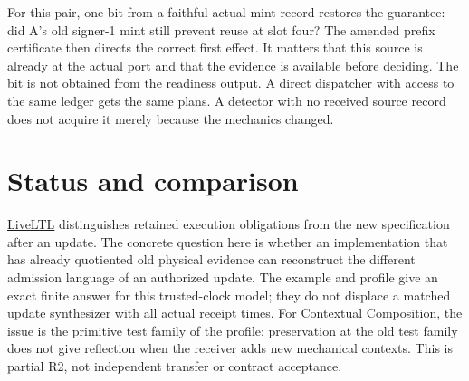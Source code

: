 \documentclass[11pt]{article}
\begin{document}
For this pair, one bit from a faithful actual-mint record restores the
guarantee: did A's old signer-1 mint still prevent reuse at slot four?
The amended prefix certificate then directs the correct first effect.
It matters that this source is already at the actual port and that
the evidence is available before deciding. The bit is not obtained
from the readiness output. A direct dispatcher with access to the same
ledger gets the same plans. A detector with no received source record
does not acquire it merely because the mechanics changed.

\section{Status and comparison}
\href{https://pmc.ncbi.nlm.nih.gov/articles/PMC9468080/}{LiveLTL}
distinguishes retained execution obligations from the new specification
after an update. The concrete question here is whether an implementation
that has already quotiented old physical evidence can reconstruct the
different admission language of an authorized update. The example and
profile give an exact finite answer for this trusted-clock model;
they do not displace a matched update synthesizer with all actual
receipt times. For Contextual Composition, the issue is the primitive
test family of the profile: preservation at the old test family does
not give reflection when the receiver adds new mechanical contexts.
This is partial R2, not independent transfer or contract acceptance.
\end{document}
